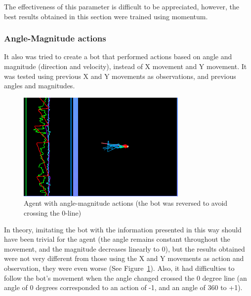 The effectiveness of this parameter is difficult to be appreciated, however, the best results obtained in this section were trained using momentum.

\subsubsection{Angle-Magnitude actions}

It also was tried to create a bot that performed actions based on angle and magnitude (direction and velocity), instead of X movement and Y movement. It was tested using previous X and Y movements as observations, and previous angles and magnitudes.

\begin{figure}[h]
  \centering
		\includegraphics[width=.6\textwidth]{img/axisAMact.png}
  \caption{Agent with angle-magnitude actions (the bot was reversed to avoid crossing the 0-line)}
  \label{fig:axisAMAS}
\end{figure}

In theory, imitating the bot with the information presented in this way should have been trivial for the agent (the angle remains constant throughout the movement, and the magnitude decreases linearly to 0), but the results obtained were not very different from those using the X and Y movements as action and observation, they were even worse (See Figure~\ref{fig:axisAMAS}). Also, it had difficulties to follow the bot's movement when the angle changed crossed the 0 degree line (an angle of 0 degrees corresponded to an action of -1, and an angle of 360 to +1).

